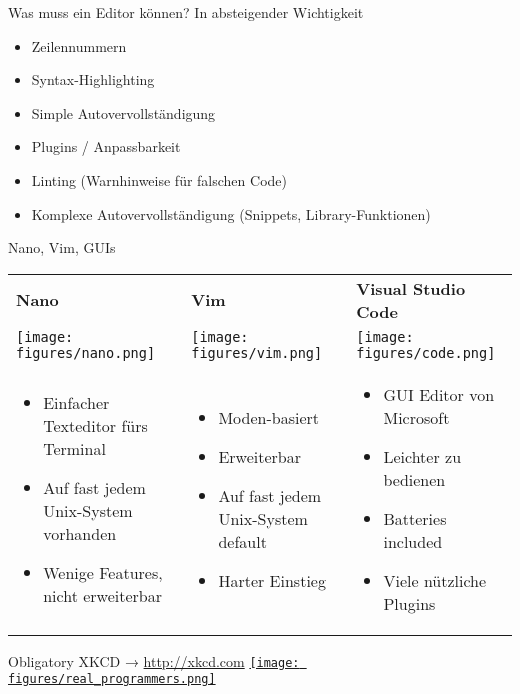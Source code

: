 \begin{frame}{Was muss ein Editor können?}
  In absteigender Wichtigkeit

  \begin{itemize}
    \item Zeilennummern
    \item Syntax-Highlighting
    \item Simple Autovervollständigung
    \item Plugins / Anpassbarkeit
    \item Linting (Warnhinweise für falschen Code)
    \item Komplexe Autovervollständigung (Snippets, Library-Funktionen)
  \end{itemize}
\end{frame}

\begin{frame}{Nano, Vim, GUIs}
  \begin{tabu}{@{} X[,C] @{} X[,C] @{} X[,C] @{}}
    \textbf{\large Nano} & \textbf{\Large Vim} & \textbf{\Large Visual Studio Code} \\
    \texttt{[image: figures/nano.png]} &
    \texttt{[image: figures/vim.png]} &
    \texttt{[image: figures/code.png]} \\
    \begin{itemize}
      \item Einfacher Texteditor fürs Terminal
      \item Auf fast jedem Unix-System vorhanden
      \item Wenige Features, nicht erweiterbar
    \end{itemize}
    &
    \begin{itemize}
      \item Moden-basiert
      \item Erweiterbar
      \item Auf fast jedem Unix-System default
      \item Harter Einstieg
    \end{itemize}
    &
    \begin{itemize}
      \item GUI Editor von Microsoft
      \item Leichter zu bedienen
      \item Batteries included
      \item Viele nützliche Plugins
    \end{itemize}
  \end{tabu}
\end{frame}

\begin{frame}{Obligatory XKCD → \url{http://xkcd.com}}
  \centering
  \href{http://xkcd.com/378/}{\texttt{[image: figures/real\_programmers.png]}}
\end{frame}
